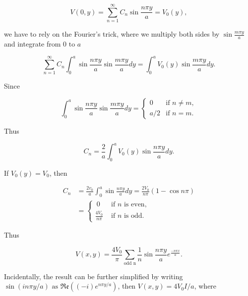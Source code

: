 \documentclass[english,a4paper,12pt]{report}
\begin{document}
{\begin{equation}
    V(0,y) = \sum_{n=1}^{\infty} C_{n} \sin \frac{n\pi y}{a} = V_0(y) ,
\end{equation}

we have to rely on the Fourier's trick, where we multiply both sides by \(\sin \frac{m\pi y}{a} \) and integrate from \(0 \text { to } a\)

\begin{equation}
    \sum_{n=1}^{\infty} C_{n} \int_{0}^{a} \sin \frac{n\pi y}{a} \sin \frac{m\pi y}{a} dy = \int_{0}^{a} V_0(y) \sin \frac{m\pi y}{a} dy.			 
\end{equation}

Since 

\begin{equation}
    \int_{0}^{a} \sin \frac{n\pi y}{a} \sin \frac{m\pi y}{a} dy = \begin{cases}
        0 & \text{if } n \neq m, \\[10pt]
        a/2 & \text{if } n = m.
        \end{cases}
\end{equation}

Thus 

\begin{equation}
    C_{n}  = \frac{2}{a} \int_{0}^{a} V_0(y) \sin \frac{n\pi y}{a} dy.  
\end{equation}

If \(V_0(y) = V_0\), then 

\begin{equation}
    \begin{aligned}
        C_{n} &= \frac{2v_0}{a} \int_{0}^{a} \sin \frac{n\pi y}{a} dy = \frac{2V_0}{n\pi } (1 - \cos n\pi )  \\ 
        &= \begin{cases}
            ~ 0 &\text { if } n  \text{ is even}, \\
            \frac{4V_0}{n\pi } &\text { if } n \text{ is odd} .
        \end{cases} 
    \end{aligned}
\end{equation}

Thus

\begin{equation}
    V(x,y) = \frac{4V_0}{\pi } \sum_{\text{odd n}}^{} \frac{1}{n} \sin \frac{n\pi y}{a}  e^{\frac{-n\pi x}{a}}. 
\end{equation}

Incidentally, the result can be further simplified by writing \( \sin (in\pi y /a) \text{ as } \mathfrak{Re} ((-i)e^{n\pi y/a } )  \), then \(V(x,y) = 4V_0 I /a\), where

}
\end{document}
